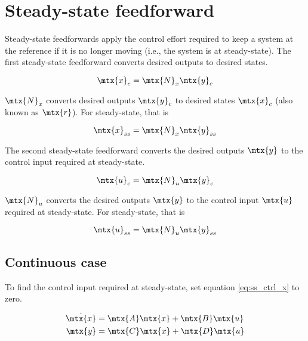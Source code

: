 
\chapter{Steady-state feedforward}

Steady-state feedforwards apply the \gls{control effort} required to keep a
\gls{system} at the \gls{reference} if it is no longer moving (i.e., the
\gls{system} is at steady-state). The first steady-state feedforward converts
desired \glspl{output} to desired \glspl{state}.

\begin{equation*}
  \mtx{x}_c = \mtx{N}_x\mtx{y}_c
\end{equation*}

$\mtx{N}_x$ converts desired \glspl{output} $\mtx{y}_c$ to desired \glspl{state}
$\mtx{x}_c$ (also known as $\mtx{r}$). For steady-state, that is

\begin{equation}
  \mtx{x}_{ss} = \mtx{N}_x\mtx{y}_{ss} \label{eq:x_ss}
\end{equation}

The second steady-state feedforward converts the desired \glspl{output}
$\mtx{y}$ to the \gls{control input} required at steady-state.

\begin{equation*}
  \mtx{u}_c = \mtx{N}_u\mtx{y}_c
\end{equation*}

$\mtx{N}_u$ converts the desired \glspl{output} $\mtx{y}$ to the
\gls{control input} $\mtx{u}$ required at steady-state. For steady-state, that
is

\begin{equation}
  \mtx{u}_{ss} = \mtx{N}_u\mtx{y}_{ss} \label{eq:u_ss}
\end{equation}

\section{Continuous case}

To find the \gls{control input} required at steady-state, set equation
\eqref{eq:ss_ctrl_x} to zero.

\begin{align*}
  \dot{\mtx{x}} &= \mtx{A}\mtx{x} + \mtx{B}\mtx{u} \\
  \mtx{y} &= \mtx{C}\mtx{x} + \mtx{D}\mtx{u}
\end{align*}

